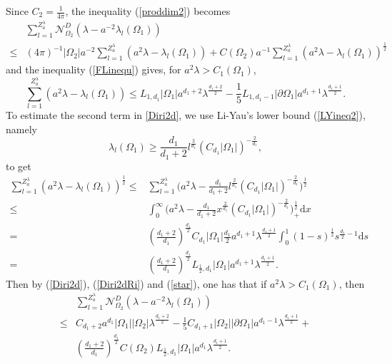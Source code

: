 \documentclass[11pt,letterpaper]{amsart}
\numberwithin{equation}{section}
\theoremstyle{plain}
\theoremstyle{plain}
\numberwithin{equation}{section}
\theoremstyle{remark}
\begin{document}
	Since $C_2=\frac 1{4\pi}$, the inequality (\ref{proddim2}) becomes
	\begin{equation}\label{Diri2d}
		\begin{aligned}
			&\sum_{l=1}^{Z^\lambda_a} \mathcal N^D_{\Omega_2} (\lambda- a^{-2}\lambda_l(\Omega_1))\\
			\le&(4\pi)^{-1}|\Omega_2| a^{-2} \sum_{l=1}^{Z^\lambda_a} (a^2\lambda- \lambda_l(\Omega_1))+ C(\Omega_2) a^{-1}\sum_{l=1}^{Z^\lambda_a} (a^2\lambda- \lambda_l(\Omega_1))^{\frac{1}{2}} 
		\end{aligned}
	\end{equation}
	and the inequality (\ref{FLinequ}) gives, for $a^2\lambda > C_1(\Omega_1)$,
	\begin{equation}\label{Diri2dRi}
		\sum_{l=1}^{Z^\lambda_a} (a^2\lambda- \lambda_l(\Omega_1)) \le L_{1,d_1} |\Omega_1| a^{d_1+2} \lambda^{\frac{d_1+2}{2}}- \frac{1}{5}L_{1,d_1-1}|\partial \Omega_1| a^{d_1+1} \lambda^{\frac{d_1+1}{2}}.
	\end{equation}
	To estimate the second term in \eqref{Diri2d}, we use Li-Yau's lower bound (\ref{LYineq2}), namely 
	\[
	\lambda_l(\Omega_1)\ge \frac{d_1}{d_1+2} l^{\frac{2}{d_1}} (C_{d_1} |\Omega_1|)^{-\frac{2}{d_1}},
	\]
	to get  
	\begin{equation}\label{star}
		\begin{aligned}
			\sum_{l=1}^{Z^\lambda_a} (a^2\lambda- \lambda_l(\Omega_1))^{\frac{1}{2}}
			\le& \sum_{l=1}^{Z^\lambda_a} \big(a^2\lambda- \frac{d_1}{d_1+2} l^{\frac{2}{d_1}} (C_{d_1} |\Omega_1|)^{-\frac{2}{d_1}}\big)^{\frac{1}{2}}\\
			\le& \int_0^\infty \big(a^2\lambda- \frac{d_1}{d_1+2}x^{\frac{2}{d_1}}(C_{d_1}|\Omega_1|)^{-\frac{2}{d_1}} \big)_{+}^{\frac{1}{2}} \mathrm{d}x\\
			=& (\frac{d_1+2}{d_1})^{\frac{d_1}{2}} C_{d_1}|\Omega_1|\frac{d_1}{2}a^{d_1+1}\lambda^{\frac{d_1+1}{2}} \int_0^1 (1-s)^{\frac{1}{2}} s^{\frac{d_1}{2}-1} \mathrm{d}s\\
			=& (\frac{d_1+2}{d_1})^{\frac{d_1}{2}} L_{\frac{1}{2}, d_1}|\Omega_1| a^{d_1+1}\lambda^{\frac{d_1+1}{2}}.
		\end{aligned}		
	\end{equation}
	Then by (\ref{Diri2d}), (\ref{Diri2dRi}) and (\ref{star}), one has that if $a^2\lambda>  C_1(\Omega_1)$, then
	\[
	\begin{aligned}
		&\sum_{l=1}^{Z^\lambda_a} \mathcal N^D_{\Omega_2} (\lambda- a^{-2}\lambda_l(\Omega_1))\\
		\le&C_{d_1+2} a^{d_1} |\Omega_1||\Omega_2|\lambda^{\frac{d_1+2}{2}}- \frac 15 C_{d_1+1} |\Omega_2|  |\partial \Omega_1| a^{d_1-1}\lambda^{\frac{d_1+1}{2}}+\\
		&(\frac{d_1+2}{d_1})^{\frac{d_1}{2}} C(\Omega_2) L_{\frac{1}{2}, d_1}|\Omega_1| a^{d_1}\lambda^{\frac{d_1+1}{2}}.
	\end{aligned}
	\]
\end{document}
